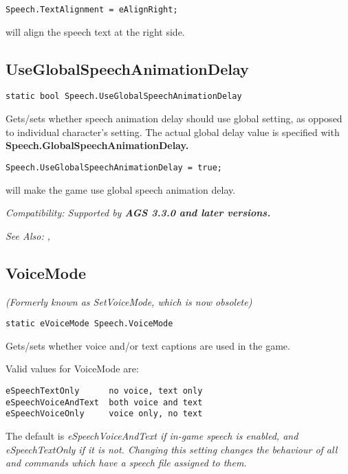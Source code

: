 \begin{verbatim}
Speech.TextAlignment = eAlignRight;
\end{verbatim}
will align the speech text at the right side.


\subsection{UseGlobalSpeechAnimationDelay}\label{Speech.UseGlobalSpeechAnimationDelay}%

\begin{verbatim}
static bool Speech.UseGlobalSpeechAnimationDelay
\end{verbatim}

Gets/sets whether speech animation delay should use global setting, as opposed to individual character's setting.
The actual global delay value is specified with \bf{Speech.GlobalSpeechAnimationDelay}.

\begin{verbatim}
Speech.UseGlobalSpeechAnimationDelay = true;
\end{verbatim}
will make the game use global speech animation delay.

\it{Compatibility:} Supported by \bf{AGS 3.3.0} and later versions.

\it{See Also:} ,


\subsection{VoiceMode}\label{Speech.VoiceMode}%

\it{(Formerly known as SetVoiceMode, which is now obsolete)}

\begin{verbatim}
static eVoiceMode Speech.VoiceMode
\end{verbatim}

Gets/sets whether voice and/or text captions are used in the game.

Valid values for VoiceMode are:
\begin{verbatim}
eSpeechTextOnly      no voice, text only
eSpeechVoiceAndText  both voice and text
eSpeechVoiceOnly     voice only, no text
\end{verbatim}
The default is \it{eSpeechVoiceAndText} if in-game speech is enabled, and \it{eSpeechTextOnly} if it
is not. Changing this setting changes the behaviour of all  and
 commands which have a speech file assigned to them.


